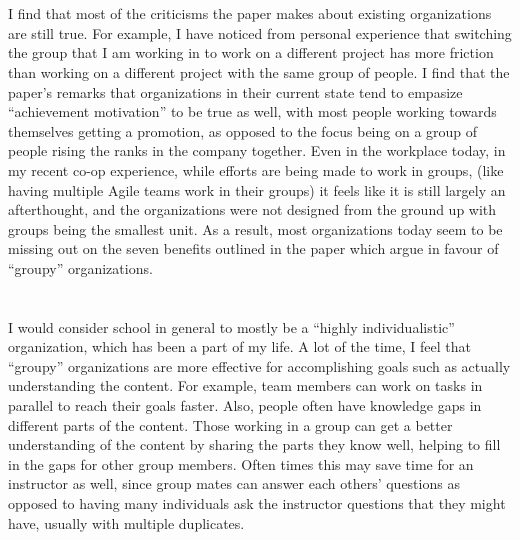 \documentclass[letterpaper,12pt]{article}
\begin{document}
  \section{}
  I find that most of the criticisms the paper makes about existing
  organizations are still true. For example, I have noticed from personal
  experience that switching the group that I am working in to work on a
  different project has more friction than working on a different project with
  the same group of people. I find that the paper's remarks that organizations
  in their current state tend to empasize ``achievement motivation'' to be true
  as well, with most people working towards themselves getting a promotion, as
  opposed to the focus being on a group of people rising the ranks in the
  company together.  Even in the workplace today, in my recent co-op
  experience, while efforts are being made to work in groups, (like having
  multiple Agile teams work in their groups) it feels like it is still largely
  an afterthought, and the organizations were not designed from the ground up
  with groups being the smallest unit. As a result, most organizations today
  seem to be missing out on the seven benefits outlined in the paper which
  argue in favour of ``groupy'' organizations.


  \section{}
  I would consider school in general to mostly be a ``highly individualistic''
  organization, which has been a part of my life.  A lot of the time, I feel
  that ``groupy'' organizations are more effective for accomplishing goals such
  as actually understanding the content.  For example, team members can work on
  tasks in parallel to reach their goals faster. Also, people often have
  knowledge gaps in different parts of the content. Those working in a group
  can get a better understanding of the content by sharing the parts they know
  well, helping to fill in the gaps for other group members. Often times this
  may save time for an instructor as well, since group mates can answer each
  others' questions as opposed to having many individuals ask the instructor
  questions that they might have, usually with multiple duplicates.
\end{document}
